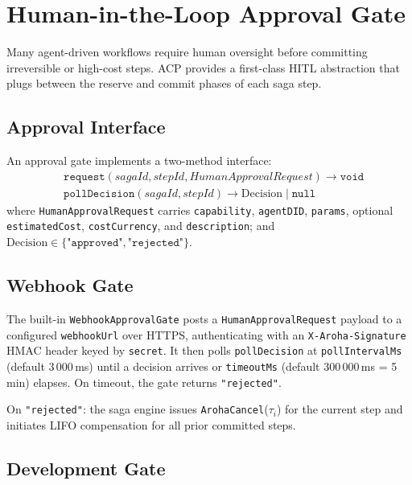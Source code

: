 \documentclass[conference]{IEEEtran}
\begin{document}
\section{Human-in-the-Loop Approval Gate}
\label{sec:hitl}

Many agent-driven workflows require human oversight before committing
irreversible or high-cost steps.  ACP provides a first-class HITL
abstraction that plugs between the reserve and commit phases of each
saga step.

\subsection{Approval Interface}

An approval gate implements a two-method interface:
\begin{align*}
  &\texttt{request}(\textit{sagaId}, \textit{stepId},
    \textit{HumanApprovalRequest}) \to \texttt{void} \\
  &\texttt{pollDecision}(\textit{sagaId}, \textit{stepId})
    \to \text{Decision} \mid \texttt{null}
\end{align*}
where \texttt{HumanApprovalRequest} carries \texttt{capability},
\texttt{agentDID}, \texttt{params}, optional \texttt{estimatedCost},
\texttt{costCurrency}, and \texttt{description}; and
$\text{Decision} \in \{\texttt{"approved"}, \texttt{"rejected"}\}$.

\subsection{Webhook Gate}

The built-in \texttt{WebhookApprovalGate} posts a
\texttt{HumanApprovalRequest} payload to a configured
\texttt{webhookUrl} over HTTPS, authenticating with an
\texttt{X-Aroha-Signature} HMAC header keyed by \texttt{secret}.
It then polls \texttt{pollDecision} at \texttt{pollIntervalMs}
(default 3\,000\,ms) until a decision arrives or
\texttt{timeoutMs} (default 300\,000\,ms = 5\,min) elapses.
On timeout, the gate returns \texttt{"rejected"}.

On \texttt{"rejected"}: the saga engine issues
\texttt{ArohaCancel}($\tau_i$) for the current step and initiates
LIFO compensation for all prior committed steps.

\subsection{Development Gate}
\end{document}
